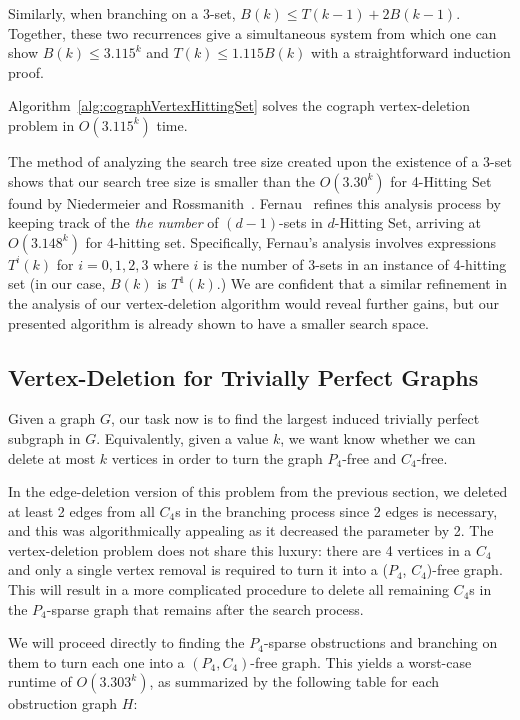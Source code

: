\documentclass{llncs}
\begin{document}
Similarly, when branching on a 3-set, $B(k) \leq T(k-1) + 2B(k-1)$. Together, these two recurrences give a simultaneous system from which one can show $B(k) \leq 3.115^k$ and $T(k) \leq 1.115B(k)$ with a straightforward induction proof.

\begin{theorem} Algorithm~\ref{alg:cographVertexHittingSet} solves the cograph vertex-deletion problem in $O(3.115^k)$ time.
\end{theorem}

The method of analyzing the search tree size created upon the existence of a 3-set shows that our search tree size is smaller than the $O(3.30^k)$ for 4-{\sc Hitting Set} found by Niedermeier and Rossmanith~\cite{NiRo}. Fernau~\cite{Fer} refines this analysis process by keeping track of the \emph{the number} of $(d-1)$-sets in $d$-{\sc Hitting Set}, arriving at $O(3.148^k)$ for 4-hitting set. Specifically, Fernau's analysis involves expressions $T^i(k)$ for $i=0,1,2,3$ where $i$ is the number of 3-sets in an instance of 4-hitting set (in our case, $B(k)$ is $T^1(k)$.) We are confident that a similar refinement in the analysis of our vertex-deletion algorithm would reveal further gains, but our presented algorithm is already shown to have a smaller search space.

\subsection{Vertex-Deletion for Trivially Perfect Graphs}

Given a graph $G$, our task now is to find the largest induced trivially perfect subgraph in $G$. Equivalently, given a value $k$, we want know whether we can delete at most $k$ vertices in order to turn the graph $P_4$-free and $C_4$-free.

In the edge-deletion version of this problem from the previous section, we deleted at least 2 edges from all $C_4$s in the branching process since 2 edges is necessary, and this was algorithmically appealing as it decreased the parameter by 2. The vertex-deletion problem does not share this luxury: there are 4 vertices in a $C_4$ and only a single vertex removal is required to turn it into a ($P_4$, $C_4$)-free graph. This will result in a more complicated procedure to delete all remaining $C_4$s in the $P_4$-sparse graph that remains after the search process.

We will proceed directly to finding the $P_4$-sparse obstructions and branching on them to turn each one into a $(P_4, C_4)$-free graph. This yields a worst-case runtime of $O(3.303^k)$, as summarized by the following table for each obstruction graph $H$:
\end{document}
